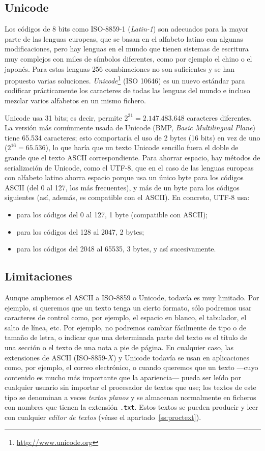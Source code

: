 \subsection{Unicode} Los códigos de 8 bits como ISO-8859-1 (\emph{Latin-1}) son adecuados para la mayor parte de las lenguas europeas, que se basan en el alfabeto latino con algunas modificaciones, pero hay lenguas en el mundo que tienen sistemas de escritura muy complejos con miles de símbolos diferentes, como por ejemplo el chino o el japonés. Para estas lenguas 256 combinaciones no son suficientes y se  han propuesto varias soluciones. \emph{Unicode}\footnote{\url{http://www.unicode.org}} (ISO 10646) es un nuevo estándar para codificar prácticamente los caracteres de todas las lenguas del mundo e incluso mezclar varios alfabetos en un mismo fichero. 

Unicode usa 31 bits; es decir, permite $2^{31}=2.147.483.648$ caracteres diferentes. La versión más comúnmente usada de Unicode (BMP, \emph{Basic Multilingual Plane}) tiene 65.534 caracteres; esto comportaría el uso de 2 bytes (16 bits) en vez de uno ($2^{16}=65.536$), lo que haría que un texto Unicode sencillo fuera el doble de grande que el texto ASCII correspondiente. Para ahorrar espacio, hay métodos de serialización de Unicode, como el UTF-8, que en el caso de las lenguas europeas con alfabeto latino ahorra espacio porque usa un único byte para los códigos ASCII (del 0 al 127, los más frecuentes), y más de un byte para los códigos siguientes (así, además, es compatible con el ASCII). En concreto, UTF-8 usa: \begin{itemize} \item para los códigos del 0 al 127, 1 byte (compatible con ASCII); \item para los códigos del 128 al 2047, 2 bytes; \item para los códigos del 2048 al 65535, 3 bytes, y así sucesivamente. \end{itemize} 

\subsection{Limitaciones} 

Aunque ampliemos el ASCII a ISO-8859 o Unicode, todavía es muy limitado. Por ejemplo, si queremos que un texto tenga un cierto formato, sólo podremos usar caracteres de control como, por ejemplo, el espacio en blanco, el tabulador, el salto de línea, etc. Por ejemplo, no podremos cambiar fácilmente de tipo o de tamaño de letra, o indicar que una determinada parte del texto es el título de una sección o el texto de una nota a pie de página. En cualquier caso, las extensiones de ASCII (ISO-8859-$X$) y Unicode todavía se usan en aplicaciones como, por ejemplo, el correo electrónico, o cuando queremos que un texto ---cuyo contenido es mucho más importante que la apariencia--- pueda ser leído por cualquier usuario sin importar el procesador de textos que use; los textos de este tipo se denominan a veces \emph{textos planos} y se almacenan normalmente en ficheros con nombres que tienen la extensión \texttt{.txt}. Estos textos se pueden producir y leer con cualquier \emph{editor de textos} (véase el apartado~\ref{ss:proctext}). 

